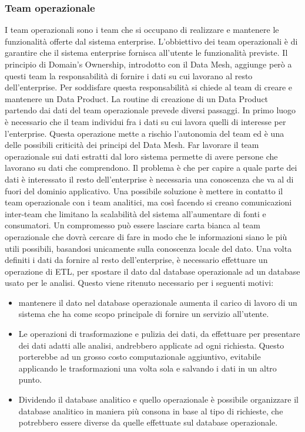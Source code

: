 \documentclass[12pt]{report}
\begin{document}
\subsubsection{Team operazionale}
I team operazionali sono i team che si occupano di realizzare e mantenere le funzionalità offerte dal sistema enterprise.
L'obbiettivo dei team operazionali è di garantire che il sistema enterprise fornisca all'utente le funzionalità previste. 
Il principio di Domain's Ownership, introdotto con il Data Mesh, aggiunge però a questi team la responsabilità di fornire i dati su cui lavorano al resto dell'enterprise.
Per soddisfare questa responsabilità si chiede al team di creare e mantenere un Data Product.
La routine di creazione di un Data Product partendo dai dati del team operazionale prevede diversi passaggi.
In primo luogo è necessario che il team individui fra i dati su cui lavora quelli di interesse per l'enterprise.
Questa operazione mette a rischio l'autonomia del team ed è una delle possibili criticità dei principi del Data Mesh. 
Far lavorare il team operazionale sui dati estratti dal loro sistema permette di avere persone che lavorano su dati che comprendono. 
Il problema è che per capire a quale parte dei dati è interessato il resto dell'enterprise è necessaria una conoscenza che va al di fuori del dominio applicativo. 
Una possibile soluzione è mettere in contatto il team operazionale con i team analitici, ma così facendo si creano comunicazioni inter-team che limitano la scalabilità del sistema all'aumentare di fonti e consumatori.
Un compromesso può essere lasciare carta bianca al team operazionale che dovrà cercare di fare in modo che le informazioni siano le più utili possibili, basandosi unicamente sulla conoscenza locale del dato.
Una volta definiti i dati da fornire al resto dell'enterprise, è necessario effettuare un operazione di ETL, per spostare il dato dal database operazionale ad un database usato per le analisi. 
Questo viene ritenuto necessario per i seguenti motivi:
\begin{itemize}
    \item mantenere il dato nel database operazionale aumenta il carico di lavoro di un sistema che ha come scopo principale di fornire un servizio all'utente.
    \item Le operazioni di trasformazione e pulizia dei dati, da effettuare per presentare dei dati adatti alle analisi, andrebbero applicate ad ogni richiesta. 
    Questo porterebbe ad un grosso costo computazionale aggiuntivo, evitabile applicando le trasformazioni una volta sola e salvando i dati in un altro punto.
    \item Dividendo il database analitico e quello operazionale è possibile organizzare il database analitico in maniera più consona in base al tipo di richieste, che potrebbero essere diverse da quelle effettuate sul database operazionale.
\end{itemize}
\end{document}
